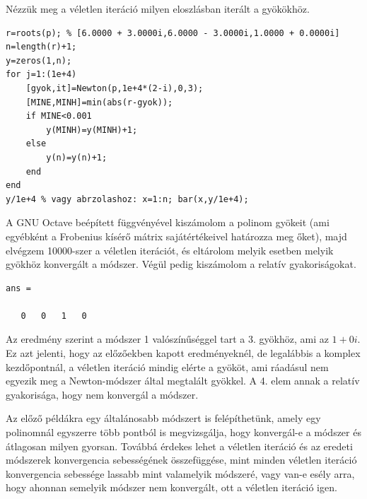 \documentclass[a4paper,12pt]{report}
\begin{document}
				Nézzük meg a véletlen iteráció milyen eloszlásban iterált a gyökökhöz.
                \begin{singlespace}
				\begin{lstlisting}[caption=Bemenet]
r=roots(p); % [6.0000 + 3.0000i,6.0000 - 3.0000i,1.0000 + 0.0000i]
n=length(r)+1;
y=zeros(1,n);
for j=1:(1e+4)
	[gyok,it]=Newton(p,1e+4*(2-i),0,3);
	[MINE,MINH]=min(abs(r-gyok));
	if MINE<0.001
		y(MINH)=y(MINH)+1;
	else
		y(n)=y(n)+1;
	end
end
y/1e+4 % vagy abrzolashoz: x=1:n; bar(x,y/1e+4);
				\end{lstlisting} 
                \end{singlespace}
				A GNU Octave beépített függvényével kiszámolom a polinom gyökeit (ami egyébként a Frobenius kísérő mátrix sajátértékeivel határozza meg őket), majd elvégzem 10000-szer a véletlen iterációt, és eltárolom melyik esetben melyik gyökhöz konvergált a módszer. Végül pedig kiszámolom a relatív gyakoriságokat.
				\begin{singlespace}
                \begin{lstlisting}[caption= Eredm\'eny]
ans =

   0   0   1   0
				\end{lstlisting}
                \end{singlespace}
                Az eredmény szerint a módszer 1 valószínűséggel tart a 3. gyökhöz, ami az $1+0i$. Ez azt jelenti, hogy az előzőekben kapott eredményeknél, de legalábbis a komplex kezdőpontnál, a véletlen iteráció mindig elérte a gyököt, ami ráadásul nem egyezik meg a Newton-módszer által megtalált gyökkel. A 4. elem annak a relatív gyakorisága, hogy nem konvergál a módszer. 

				Az előző példákra egy általánosabb módszert is felépíthetünk, amely egy polinomnál egyszerre több pontból is megvizsgálja, hogy konvergál-e a módszer és átlagosan milyen gyorsan. Továbbá érdekes lehet a véletlen iteráció és az eredeti módszerek konvergencia sebességének összefüggése, mint minden véletlen iteráció konvergencia sebessége lassabb mint valamelyik módszeré, vagy van-e esély arra, hogy ahonnan semelyik módszer nem konvergált, ott a véletlen iteráció igen.
				
\end{document}
